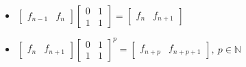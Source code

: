 \begin{itemize}

\item $\begin{bmatrix} f_{n-1} & f_n \end{bmatrix}
      \begin{bmatrix} 0 & 1 \\ 1 & 1 \end{bmatrix} =
      \begin{bmatrix} f_n & f_{n+1} \end{bmatrix}$
\item $\begin{bmatrix} f_n & f_{n+1} \end{bmatrix}
      {\begin{bmatrix} 0 & 1 \\ 1 & 1 \end{bmatrix}}^p =
      \begin{bmatrix} f_{n+p} & f_{n+p+1} \end{bmatrix},
      \ p \in \mathbb{N}$
 
\end{itemize}